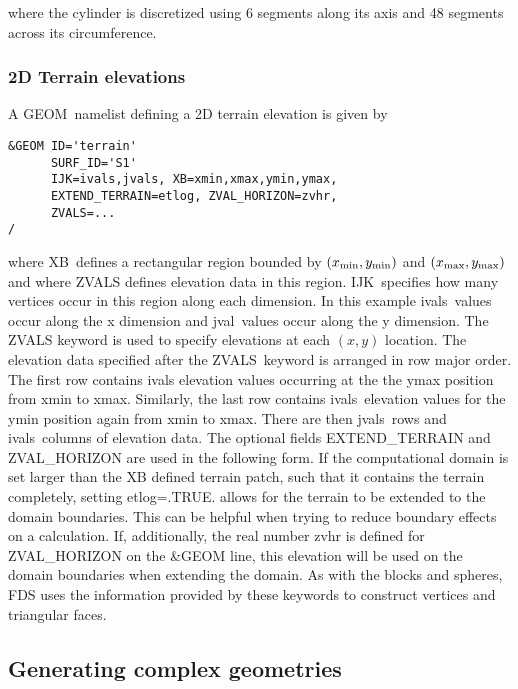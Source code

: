 \documentclass[12pt]{article}
\begin{document}
where the cylinder is discretized using 6 segments along its axis and 48 segments across its circumference.


\subsubsection{2D Terrain elevations}
A {\ct GEOM}\ namelist defining a 2D terrain elevation is given by

\begin{verbatim}
&GEOM ID='terrain'
      SURF_ID='S1'
      IJK=ivals,jvals, XB=xmin,xmax,ymin,ymax,
      EXTEND_TERRAIN=etlog, ZVAL_HORIZON=zvhr,
      ZVALS=...
/
\end{verbatim}

\noindent where {\ct XB}\ defines a rectangular region bounded by $(x_{\rm min}, y_{\rm min})$  and $(x_{\rm max}, y_{\rm max})$
and where {\ct ZVALS} defines elevation data in this region.
{\ct IJK}\ specifies how many vertices occur in this region along each dimension.
In this example {\ct ivals}\ values occur along the x dimension and {\ct jval}\ values occur along the y dimension.
The {\ct ZVALS} keyword is used to specify elevations at each $(x,y)$ location.
The elevation data specified after the {\ct ZVALS}\ keyword is arranged in row major order.
The first row contains {\ct ivals} elevation values occurring at the the ymax position from xmin to xmax.
Similarly, the last row contains
{\ct ivals}\ elevation values for the ymin position again from xmin to xmax.
There are then {\ct jvals}\ rows and {\ct ivals}\ columns of elevation data.
The optional fields {\ct EXTEND\_TERRAIN} and {\ct ZVAL\_HORIZON} are used in the following form. If the computational domain is set larger than the {\ct XB} defined terrain patch, such that it contains the terrain completely, setting {\ct etlog=.TRUE.} allows for the terrain to be extended to the domain boundaries. This can be helpful when trying to reduce boundary effects on a calculation.
If, additionally, the real number {\ct zvhr} is defined for {\ct ZVAL\_HORIZON} on the {\ct \&GEOM} line, this elevation will be used on the domain boundaries when extending the domain.
As with the blocks and spheres, FDS uses the information provided by these keywords to construct
vertices and triangular faces.

\subsection{Generating complex geometries}
\end{document}
